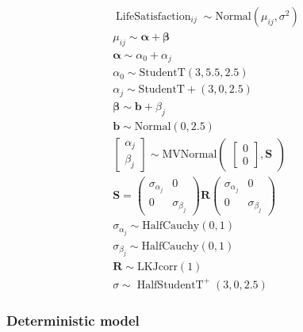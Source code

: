 \documentclass[
  english,
  man,floatsintext]{apa6}
\begin{document}
\[
\begin{aligned}
\operatorname{Life Satisfaction}_{ij} \sim \text{Normal}(\mu_{ij},\sigma^2) \nonumber\\
\mu_{ij}\sim \boldsymbol{\alpha +\beta} \nonumber\\
\boldsymbol{\alpha} \sim \alpha_{0} +\alpha_j \nonumber\\
\alpha_{0} \sim \text{StudentT}(3,5.5,2.5)\nonumber\\
\alpha_j \sim \text{StudentT}+(3,0,2.5)\nonumber\\
\boldsymbol{\beta}\sim \boldsymbol{b} + \beta_j \nonumber\\
\boldsymbol{b}\sim\text{Normal}(0,2.5) \nonumber\\
\begin{bmatrix}
\alpha_j \\
\beta_j
\end{bmatrix}
\sim 
\text{MVNormal}
\begin{pmatrix}
\begin{bmatrix}
0\\
0
\end{bmatrix}
,\boldsymbol{S} \nonumber
\end{pmatrix}\\
\boldsymbol{S} = 
\begin{pmatrix}
\sigma_{\alpha_j} & 0 \\
0 & \sigma_{\beta_j} \nonumber
\end{pmatrix} \boldsymbol{R} \begin{pmatrix}
\sigma_{\alpha_j} & 0 \\
0 & \sigma_{\beta_j} \nonumber
\end{pmatrix}\\
\sigma_{\alpha_j} \sim 
\text{HalfCauchy}(0,1) \nonumber\\
\sigma_{\beta_j} \sim 
\text{HalfCauchy}(0,1) \nonumber\\
\boldsymbol{R}\sim \text{LKJcorr}(1) \nonumber\\
\sigma  \sim  \operatorname{HalfStudent T}^{+}(3, 0, 2.5) 
\end{aligned}
\]
\newpage

\hypertarget{deterministic-model}{%
\subsubsection{Deterministic model}\label{deterministic-model}}
\end{document}
